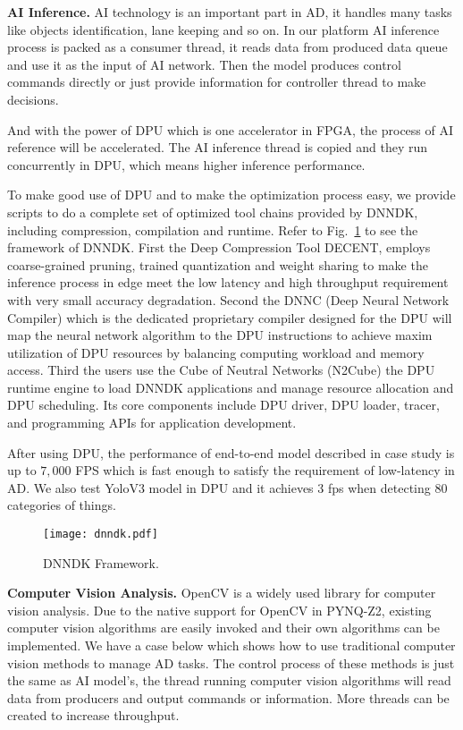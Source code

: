 \textbf{AI Inference.} AI technology is an important part in AD, it handles many tasks like objects identification, lane keeping and so on. In our platform AI inference process is packed as a consumer thread, it reads data from produced data queue and use it as the input of AI network. Then the model produces control commands directly or just provide information for controller thread to make decisions. 

And with the power of DPU\cite{dnndk} which is one accelerator in FPGA, the process of AI reference will be accelerated. The AI inference thread is copied and they run concurrently in DPU, which means higher inference performance. 

To make good use of DPU and to make the optimization process easy, we provide scripts to do a complete set of optimized tool chains provided by DNNDK, including compression, compilation and runtime. Refer to Fig.~\ref{fig:dnndk} to see the framework of DNNDK. First the Deep Compression Tool DECENT\cite{dnndk}, employs coarse-grained pruning, trained quantization and weight sharing to make the inference process in edge meet the low latency and high throughput requirement with very small accuracy degradation. Second the DNNC (Deep Neural Network Compiler)\cite{dnndk} which is the dedicated proprietary compiler designed for the DPU will map the neural network algorithm to the DPU instructions to achieve maxim utilization of DPU resources by balancing computing workload and memory access. Third the users use the Cube of Neutral Networks (N2Cube)\cite{dnndk} the DPU runtime engine to load DNNDK applications and manage resource allocation and DPU scheduling. Its core components include DPU driver, DPU loader, tracer, and programming APIs for application development.

After using DPU, the performance of end-to-end model described in case study is up to $7,000$ FPS which is fast enough to satisfy the requirement of low-latency in AD. We also test YoloV3\cite{redmon2018yolov3} model in DPU and it achieves 3 fps when detecting 80 categories of things.

\begin{figure}[t]
    \centering
    \texttt{[image: dnndk.pdf]}
    \caption{DNNDK Framework.}
    \label{fig:dnndk}
\end{figure}

\textbf{Computer Vision Analysis.} OpenCV\cite{opencv} is a widely used library for computer vision analysis. Due to the native support for OpenCV in PYNQ-Z2, existing computer vision algorithms are easily invoked and their own algorithms can be implemented. We have a case below which shows how to use traditional computer vision methods to manage AD tasks. The control process of these methods is just the same as AI model's, the thread running computer vision algorithms will read data from producers and output commands or information. More threads can be created to increase throughput. 

